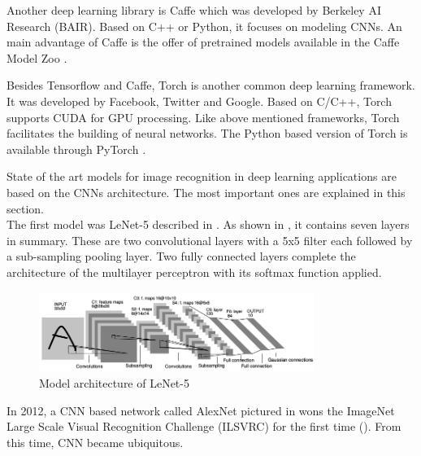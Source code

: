 Another deep learning library is Caffe which was developed by Berkeley AI Research (BAIR). Based on C++ or Python, it focuses on modeling CNNs. An main advantage of Caffe is the offer of pretrained models available in the Caffe Model Zoo \citep{BAIR}. 

Besides Tensorflow and Caffe, Torch is another common deep learning framework. It was developed by Facebook, Twitter and Google. Based on C/C++, Torch supports CUDA for GPU processing. Like above mentioned frameworks, Torch facilitates the building of neural networks. The Python based version of Torch is available through PyTorch \citep{Varangaonkar2017}.
		
State of the art models for image recognition in deep learning applications are based on the CNNs architecture. The most important ones are explained in this section. \\

The first model was LeNet-5 described in \citet{LeCun1998}. As shown in , it contains seven layers in summary. These are two convolutional layers with a 5x5 filter each followed by a sub-sampling pooling layer. Two fully connected layers complete the architecture of the multilayer perceptron with its softmax function applied.\\
	
\begin{figure}[htbp]
\centering
\includegraphics[width=0.8\textwidth]{includes/LeNetLecun-01a}
\caption[Model architecture of LeNet-5]{Model architecture of LeNet-5 \citep[p. 7]{LeCun1998}}
\label{fig:LeNet}
\end{figure} 

In 2012, a CNN based network called AlexNet pictured in \citet{Krizhevsky2012} wons the ImageNet Large Scale Visual Recognition Challenge (ILSVRC) for the first time (). From this time, CNN became ubiquitous.\\

